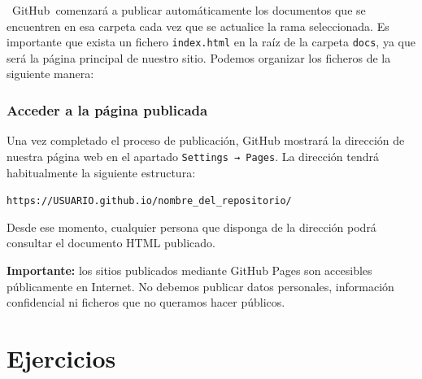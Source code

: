 \documentclass[11pt,a4paper]{article}
\newcommand{\GitHub}{\faIcon{github}~\!GitHub}
\theoremstyle{exercise}
\begin{document}
\GitHub\ comenzará a publicar automáticamente los documentos que se encuentren en esa carpeta cada vez que se actualice la rama seleccionada. Es importante que exista un fichero \verb|index.html| en la raíz de la carpeta \verb|docs|, ya que será la página principal de nuestro sitio. Podemos organizar los ficheros de la siguiente manera:

\begin{center}
\begin{minipage}{0.75\linewidth}
\end{minipage}
\end{center}

\subsubsection{Acceder a la página publicada}



Una vez completado el proceso de publicación, GitHub mostrará la dirección de nuestra página web en el apartado \texttt{Settings → Pages}. La dirección tendrá habitualmente la siguiente estructura:

\begin{center}
	\verb|https://USUARIO.github.io/nombre_del_repositorio/|
\end{center}


Desde ese momento, cualquier persona que disponga de la dirección podrá consultar el documento HTML publicado.

\medskip

\noindent \textbf{Importante:} los sitios publicados mediante GitHub Pages son accesibles públicamente en Internet. No debemos publicar datos personales, información confidencial ni ficheros que no queramos hacer públicos.



\section{Ejercicios}
\end{document}
